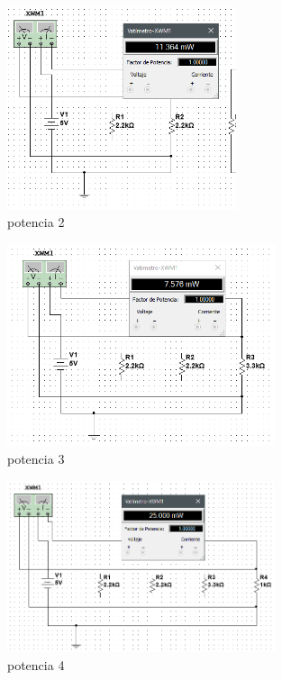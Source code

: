 \documentclass[letterpaper,12pt]{article}
\begin{document}
\begin{sloppypar}
\begin{enumerate}
\begin{figure}[H]
        \includegraphics[width=0.6\textwidth]{images/proytec/pp2.PNG}
        \caption{potencia 2}
    \end{figure}
    \begin{figure}[H]
        \centering
        \includegraphics[width=0.7\textwidth]{images/proytec/pp3.png}
        \caption{potencia 3}
    \end{figure}
    \begin{figure}[H]
        \centering
        \includegraphics[width=0.7\textwidth]{images/proytec/pp4.png}
        \caption{potencia 4}
    \end{figure}
    \begin{figure}[H]

\end{figure}
\end{enumerate}
\end{sloppypar}
\end{document}
